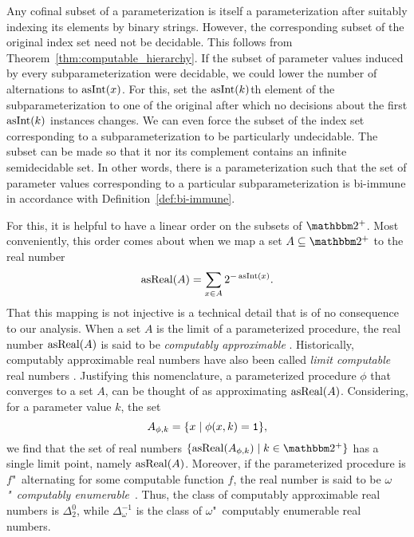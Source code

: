 Any cofinal subset of a parameterization is itself a parameterization after suitably indexing its elements by binary strings.
However, the corresponding subset of the original index set need not be decidable.
This follows from Theorem~\ref{thm:computable_hierarchy}.
If the subset of parameter values induced by every subparameterization were decidable, we could lower the number of alternations to $\operatorname{asInt}(x)$.
For this, set the $\operatorname{asInt}(k)$th element of the subparameterization to one of the original after which no decisions about the first $\operatorname{asInt}(k)$ instances changes.
We can even force the subset of the index set corresponding to a subparameterization to be particularly undecidable.
The subset can be made so that it nor its complement contains an infinite semidecidable set.
In other words, there is a parameterization such that the set of parameter values corresponding to a particular subparameterization is bi-immune in accordance with Definition~\ref{def:bi-immune}.

For this, it is helpful to have a linear order on the subsets of $\binary^+$.
Most conveniently, this order comes about when we map a set $A \subseteq \binary^+$ to the real number
\begin{equation*}
  \operatorname{asReal}(A) = \sum_{x \in A} 2^{-\operatorname{asInt}(x)}.
\end{equation*}
That this mapping is not injective is a technical detail that is of no consequence to our analysis.
When a set $A$ is the limit of a parameterized procedure, the real number $\operatorname{asReal}(A)$ is said to be \emph{computably approximable} \parencite{ambos-spies2000weakly}.
Historically, computably approximable real numbers have also been called \emph{limit computable} real numbers \parencite{gold1965limiting}.
Justifying this nomenclature, a parameterized procedure $\phi$ that converges to a set $A$, can be thought of as approximating $\operatorname{asReal}(A)$.
Considering, for a parameter value $k$, the set
\begin{equation*}
  A_{\phi, k} = \{x \;|\; \phi(x, k) = \textnormal{\texttt{1}}\},
\end{equation*}
we find that the set of real numbers $\{\asReal(A_{\phi, k}) \st k \in \binary^+\}$ has a single limit point, namely $\operatorname{asReal}(A)$.
Moreover, if the parameterized procedure is $f$"~alternating for some computable function $f$, the real number is said to be \emph{$\omega$"~computably enumerable}~\parencite{ambos-spies2000weakly}.
Thus, the class of computably approximable real numbers is $\Delta^0_2$, while $\Delta^{-1}_\omega$ is the class of $\omega$"~computably enumerable real numbers.

